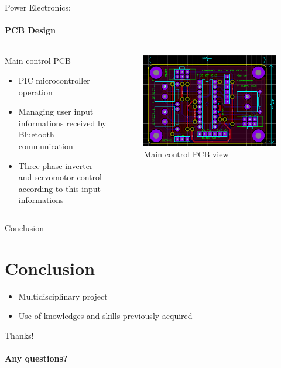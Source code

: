 \documentclass{beamer}
\begin{document}
	\begin{frame}{Power Electronics:}
		\framesubtitle{PCB Design}
		\begin{columns}[T]
	  		\begin{column}{0.5\textwidth}
	  			Main control PCB
		    	\begin{itemize}
		    		\item PIC microcontroller operation
		    		\item Managing user input informations received by Bluetooth communication
		    		\item Three phase inverter and servomotor control according to this input informations
		    	\end{itemize}
	  		\end{column}
	  		\begin{column}{0.5\textwidth}
	  			\begin{figure}
	  				\begin{center}
	  					\includegraphics[height=0.4\textheight]{../Illus/PCB_Main.PNG}
	  				\end{center}
	    			\caption{Main control PCB view}
	    		\end{figure}
	  		\end{column}
		\end{columns}
	\end{frame}	
	\begin{frame}{Conclusion}
	\section*{Conclusion}
	\begin{itemize}
		    \item Multidisciplinary project
		    \item Use of knowledges and skills previously acquired
		\end{itemize}
	\end{frame}
	\author[]{Florian POUTHIER - Tristan DRUSSEL\\ \tiny florian.pouthier@insa-strasbourg.fr - tristan.drussel@insa-strasbourg.fr}

	\begin{frame}[plain]{Thanks!}
	\framesubtitle{Any questions?}
	\section*{}
		\titlepage
	\end{frame}
\end{document}
